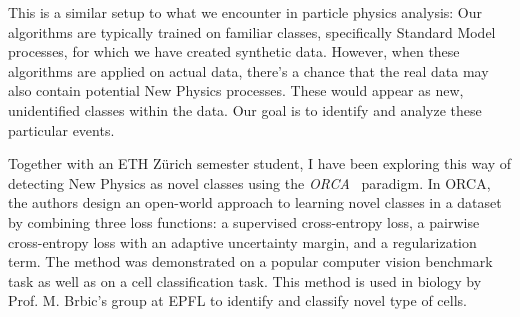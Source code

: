 \documentclass[12pt]{iopart}
\begin{document}
This is a similar setup to what we encounter in particle physics analysis: Our algorithms are typically trained on familiar classes, specifically Standard Model processes, for which we have created synthetic data. However, when these algorithms are applied on actual data, there's a chance that the real data may also contain potential New Physics processes. These would appear as new, unidentified classes within the data. Our goal is to identify and analyze these particular events.

Together with an ETH Zürich semester student, I have been exploring this way of detecting New Physics as novel classes using the \textit{ORCA}~\cite{cao2022openworld} paradigm. In ORCA, the authors design an open-world approach to learning novel classes in a dataset by combining three loss functions: a supervised cross-entropy loss, a pairwise cross-entropy loss with an adaptive uncertainty margin, and a regularization term. The method was demonstrated on a popular computer vision benchmark task as well as on a cell classification task. This method is used in biology by Prof. M. Brbic's group at EPFL to identify and classify novel type of cells.
 
\end{document}
